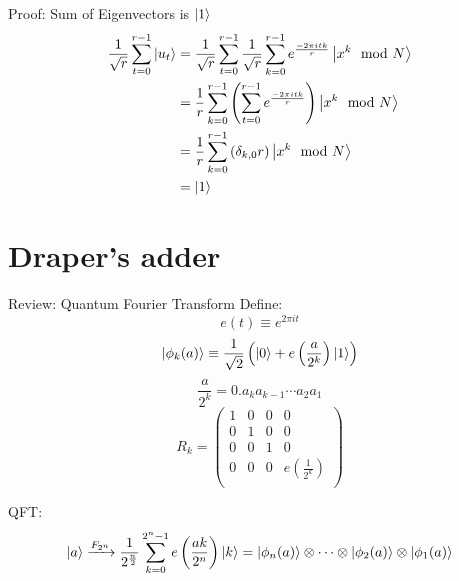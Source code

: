\documentclass{beamer}
\begin{document}
\begin{frame}{Proof: Sum of Eigenvectors is $\ket{1}$}
	\begin{align*}
		\frac{1}{\sqrt{r}} \sum_{t=0}^{r-1} \ket{u_t} &= \frac{1}{\sqrt{r}}
		\sum_{t=0}^{r-1} \frac{1}{\sqrt{r}} \sum_{k=0}^{r-1} 
		e^{\frac{-2\pi i tk}{r}}\ket{x^k \mod N}\\
		&= \frac{1}{r} \sum_{k=0}^{r-1} \left( \sum_{t=0}^{r-1} 
		e^{\frac{-2\pi i tk}{r}}\right) \ket{x^k \mod N}\\
		&= \frac{1}{r} \sum_{k=0}^{r-1} \left(\delta_{k, 0} r \right) \ket{x^k \mod N}\\
		&= \ket{1}
	\end{align*}
\end{frame}

\section{Draper's adder}%
\label{sec:draper_s_adder}

\begin{frame}{Review: Quantum Fourier Transform}
	Define:
	\begin{equation*}
		e(t) \equiv e^{2 \pi i t}
	\end{equation*}
	\begin{equation*}
		\ket{\phi_k (a)} \equiv \frac{1}{\sqrt{2}} \left( \ket{0} + e\left( 
		\frac{a}{2^k}\right) \ket{1} \right)
	\end{equation*}
	\begin{equation*}
		\frac{a}{2^k} = 0.a_k a_{k-1} \cdots a_2 a_1
	\end{equation*}
	\begin{equation*}
		R_k = 
		\begin{pmatrix}
			1 & 0 & 0 & 0 \\
			0 & 1 & 0 & 0 \\
			0 & 0 & 1 & 0 \\
			0 & 0 & 0 & e\left( \frac{1}{2^k} \right)\\
		\end{pmatrix}
	\end{equation*}
	
	QFT:
	\begin{equation*}
		\ket{a} \xrightarrow{F_{2^n}} \frac{1}{2^{\frac{n}{2}}} \sum_{k=0}^{2^n-1}
		e\left( \frac{ak}{2^n} \right)\ket{k} = \ket{\phi_n (a) } \otimes \cdots
		\otimes \ket{\phi_2 (a) } \otimes \ket{\phi_1 (a) }
	\end{equation*}

	
\end{frame}
\end{document}
